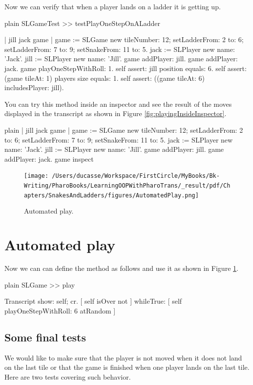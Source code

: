 \documentclass[10pt,twoside,english]{_support/latex/sbabook/sbabook}
\begin{document}
Now we can verify that when a player lands on a ladder it is getting up. 

\begin{displaycode}{plain}
SLGameTest >> testPlayOneStepOnALadder
	
	| jill jack game |
	game := SLGame new 
				tileNumber: 12; 
				setLadderFrom: 2 to: 6;
				setLadderFrom: 7 to: 9;
				setSnakeFrom: 11 to: 5.
	jack := SLPlayer new name: 'Jack'.
	jill := SLPlayer new name: 'Jill'.
	game addPlayer: jill.
	game addPlayer: jack.
	game playOneStepWithRoll: 1.
	self assert: jill position equals: 6.
	self assert: (game tileAt: 1) players size equals: 1.
	self assert: ((game tileAt: 6) includesPlayer: jill).
\end{displaycode}

You can try this method inside an inspector and see the result of the moves displayed in the transcript as shown in Figure \ref{fig:playingInsideInspector}.

\begin{displaycode}{plain}
| jill jack game |
game := SLGame new 
			tileNumber: 12; 
			setLadderFrom: 2 to: 6;
			setLadderFrom: 7 to: 9;
			setSnakeFrom: 11 to: 5.
jack := SLPlayer new name: 'Jack'.
jill := SLPlayer new name: 'Jill'.
game addPlayer: jill.
game addPlayer: jack.
game inspect
\end{displaycode}


\begin{figure}

\begin{center}
\texttt{[image: /Users/ducasse/Workspace/FirstCircle/MyBooks/Bk-Writing/PharoBooks/LearningOOPWithPharoTrans/\_result/pdf/Chapters/SnakesAndLadders/figures/AutomatedPlay.png]}\caption{Automated play.\label{fig:AutomatedPlay}}\end{center}
\end{figure}

\section{Automated play}
Now we can can define the  method as follows and use it as shown in Figure \ref{fig:AutomatedPlay}.

\begin{displaycode}{plain}
SLGame >> play

	Transcript show: self; cr.
	[ self isOver not ] whileTrue: [
		self playOneStepWithRoll: 6 atRandom ] 
\end{displaycode}
\subsection{Some final tests}
We would like to make sure that the player is not moved when it does not land on the last tile or that the game is finished when one player lands on the last tile. Here are two tests covering such behavior.
\end{document}
